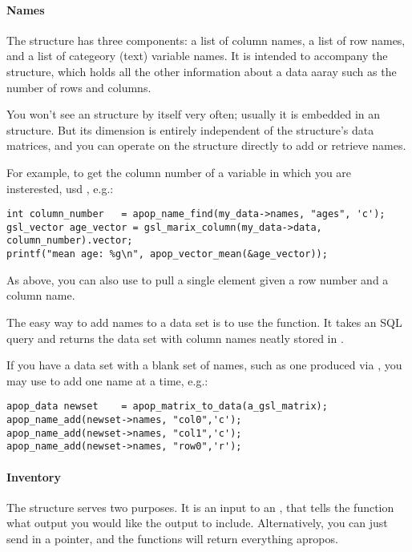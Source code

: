 \paragraph{Names}
The  structure has three components: a list of column
names, a list of row names, and a list of categeory (text) variable
names. It is intended to accompany the  structure,
which holds all the other information about a data aaray such as the
number of rows and columns.

You won't see an  structure by itself very often;
usually it is embedded in an  structure. But its
dimension is entirely independent of the  structure's
data matrices, and you can operate on the  structure
directly to add or retrieve names.

For example, to get the
column number of a variable in which you are insterested, usd , e.g.:
\begin{lstlisting}
int column_number   = apop_name_find(my_data->names, "ages", 'c');
gsl_vector age_vector = gsl_marix_column(my_data->data, column_number).vector;
printf("mean age: %g\n", apop_vector_mean(&age_vector));
\end{lstlisting}
As above, you can also use  to pull a single
element given a row number and a column name.

The easy way to add names to a data set is to use the 
 function. It takes an SQL query and returns
the data set with column names neatly stored in
.

If you have a data set with a blank set of names, such as one
produced via ,
you may use  to add one name at a
time, e.g.:
\begin{lstlisting}
apop_data newset    = apop_matrix_to_data(a_gsl_matrix);
apop_name_add(newset->names, "col0",'c');
apop_name_add(newset->names, "col1",'c');
apop_name_add(newset->names, "row0",'r');
\end{lstlisting}

\paragraph{Inventory}
The  structure serves two purposes. It is an input
to an , that tells the function what output you
would like the  output to include.  Alternatively, you
can just send in a  pointer, and the functions will return
everything apropos.

